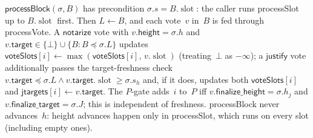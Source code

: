 \ifx\litemode\undefined\documentclass{article}\fi
\newcommand{\slot}[0]{\ensuremath{\operatorname{\mathrm{slot}}}}
\newcommand{\target}{\mathsf{target}}
\newcommand{\height}{\mathsf{height}}
\newcommand{\just}{\ensuremath{\mathsf{justify}}\xspace}
\newcommand{\notar}{\ensuremath{\mathsf{notarize}}\xspace}
\newcommand{\finalizeHeight}{\mathsf{finalize\_height}}
\newcommand{\finalizeTarget}{\mathsf{finalize\_target}}
\newcommand{\jtargets}{\mathsf{jtargets}}
\newcommand{\voteSlots}{\mathsf{voteSlots}}
\newcommand{\processSlot}{\textsf{processSlot}\xspace}
\newcommand{\processBlock}{\textsf{processBlock}\xspace}
\newcommand{\processVote}{\textsf{processVote}\xspace}
\theoremstyle{plain}
\theoremstyle{definition}
\theoremstyle{remark}
\begin{document}
$\processBlock(\sigma, B)$ has precondition $\sigma.s = B.\slot$: the caller runs \processSlot up to $B.\slot$ first.
Then $L \gets B$, and each vote~$v$ in~$B$ is fed through \processVote.
A \notar vote with $v.\height = \sigma.h$ and $v.\target \in \{\bot\} \cup \{B : B \preceq \sigma.L\}$ updates $\voteSlots[i] \gets \max(\voteSlots[i],\, v.\slot)$ (treating~$\bot$ as $-\infty$); a \just vote additionally passes the target-freshness check $v.\target \preceq \sigma.L \wedge v.\target.\slot \geq \sigma.s_h$ and, if it does, updates both $\voteSlots[i]$ and $\jtargets[i] \gets v.\target$.
The $P$-gate adds~$i$ to~$P$ iff $v.\finalizeHeight = \sigma.h_j$ and $v.\finalizeTarget = \sigma.J$; this is independent of freshness.
\processBlock never advances~$h$: height advances happen only in \processSlot, which runs on every slot (including empty ones).
\end{document}
